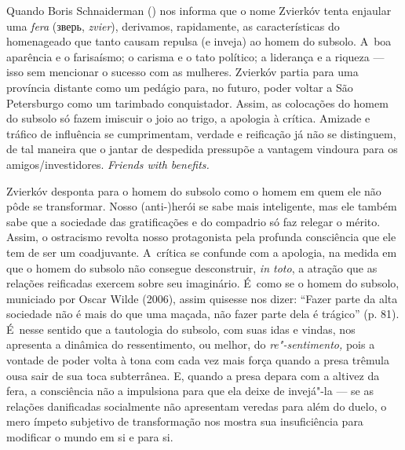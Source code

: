 Quando Boris Schnaiderman () nos informa que o nome Zvierkóv tenta
enjaular uma \emph{fera}
(зверь,
\emph{zvier}), derivamos, rapidamente, as características do homenageado
que tanto causam repulsa (e inveja) ao homem do subsolo. A~boa aparência
e o farisaísmo; o carisma e o tato político; a liderança e a riqueza ---
isso sem mencionar o sucesso com as mulheres. Zvierkóv partia para uma
província distante como um pedágio para, no futuro, poder voltar a São
Petersburgo como um tarimbado conquistador. Assim, as colocações do
homem do subsolo só fazem imiscuir o joio ao trigo, a apologia à
crítica. Amizade e tráfico de influência se cumprimentam, verdade e
reificação já não se distinguem, de tal maneira que o jantar de
despedida pressupõe a vantagem vindoura para os amigos/investidores.
\emph{Friends with benefits.}

Zvierkóv desponta para o homem do subsolo como o homem em quem ele não
pôde se transformar. Nosso \mbox{(anti-)herói} se sabe mais inteligente, mas
ele também sabe que a sociedade das gratificações e do compadrio só faz
relegar o mérito. Assim, o ostracismo revolta nosso protagonista pela
profunda consciência que ele tem de ser um coadjuvante. A~crítica se
confunde com a apologia, na medida em que o homem do subsolo não
consegue desconstruir, \emph{in toto}, a atração que as relações
reificadas exercem sobre seu imaginário. É~como se o homem do subsolo,
municiado por Oscar Wilde (2006), assim quisesse nos dizer: ``Fazer
parte da alta sociedade não é mais do que uma maçada, não fazer parte
dela é trágico'' (p. 81). É~nesse sentido que a tautologia do subsolo,
com suas idas e vindas, nos apresenta a dinâmica do ressentimento, ou
melhor, do \emph{re"-sentimento,} pois a vontade de poder volta à tona
com cada vez mais força quando a presa trêmula ousa sair de sua toca
subterrânea. E, quando a presa depara com a altivez da fera, a
consciência não a impulsiona para que ela deixe de invejá"-la --- se as
relações danificadas socialmente não apresentam veredas para além do
duelo, o mero ímpeto subjetivo de transformação nos mostra sua
insuficiência para modificar o mundo em si e para si.

